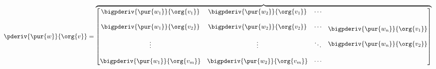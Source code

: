 \begin{definition}
                \begin{equation*}
                    \pderiv{ \pur{w} }{ \org{v} } 
                    =
                    \overbrace{
                        \begin{bmatrix}
                            \begin{matrix}
                                \bigpderiv{ \pur{w_1} }   { \org{v_1} }\\ 
                                \\
                                \bigpderiv{ \pur{w_1} }   { \org{v_2} }\\ 
                                \\
                                \vdots \\ 
                                \\
                                \bigpderiv{ \pur{w_1} }   { \org{v_m} }
                            \end{matrix} &
                            \begin{matrix}
                                \bigpderiv{ \pur{w_2} }   { \org{v_1} }\\ 
                                \\
                                \bigpderiv{ \pur{w_2} }   { \org{v_2} }\\ 
                                \\
                                \vdots \\ 
                                \\
                                \bigpderiv{ \pur{w_2} }   { \org{v_m} }
                            \end{matrix} &
                            \begin{matrix}
                                \cdots\\\\ \cdots \\\\ \ddots \\\\ \cdots
                            \end{matrix} &
                            \begin{matrix}
                                \bigpderiv{ \pur{w_n} }   { \org{v_1} }\\ 
                                \\
                                \bigpderiv{ \pur{w_n} }   { \org{v_2} }\\ 

\end{matrix}
\end{bmatrix}}
\end{equation*}
\end{definition}
